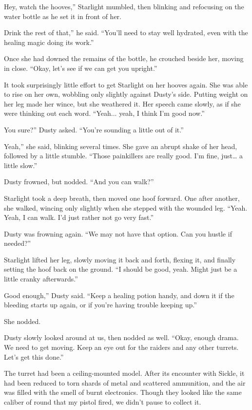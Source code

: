 \leavevmode{}Hey, watch the hooves,” Starlight mumbled, then blinking and refocusing on the water bottle as he set it in front of her.

\leavevmode{}Drink the rest of that,” he said. “You’ll need to stay well hydrated, even with the healing magic doing its work.”

Once she had downed the remains of the bottle, he crouched beside her, moving in close. “Okay, let’s see if we can get you upright.”

It took surprisingly little effort to get Starlight on her hooves again. She was able to rise on her own, wobbling only slightly against Dusty’s side. Putting weight on her leg made her wince, but she weathered it. Her speech came slowly, as if she were thinking out each word. “Yeah... yeah, I think I’m good now.”

\leavevmode{}You sure?” Dusty asked. “You’re sounding a little out of it.”

\leavevmode{}Yeah,” she said, blinking several times. She gave an abrupt shake of her head, followed by a little stumble. “Those painkillers are really good. I’m fine, just… a little slow.”

Dusty frowned, but nodded. “And you can walk?”

Starlight took a deep breath, then moved one hoof forward. One after another, she walked, wincing only slightly when she stepped with the wounded leg. “Yeah. Yeah, I can walk. I’d just rather not go very fast.”

Dusty was frowning again. “We may not have that option. Can you hustle if needed?”

Starlight lifted her leg, slowly moving it back and forth, flexing it, and finally setting the hoof back on the ground. “I should be good, yeah. Might just be a little cranky afterwards.”

\leavevmode{}Good enough,” Dusty said. “Keep a healing potion handy, and down it if the bleeding starts up again, or if you’re having trouble keeping up.”

She nodded.

Dusty slowly looked around at us, then nodded as well. “Okay, enough drama. We need to get moving. Keep an eye out for the raiders and any other turrets. Let’s get this done.”

The turret had been a ceiling-mounted model. After its encounter with Sickle, it had been reduced to torn shards of metal and scattered ammunition, and the air was filled with the smell of burnt electronics. Though they looked like the same caliber of round that my pistol fired, we didn’t pause to collect it.

